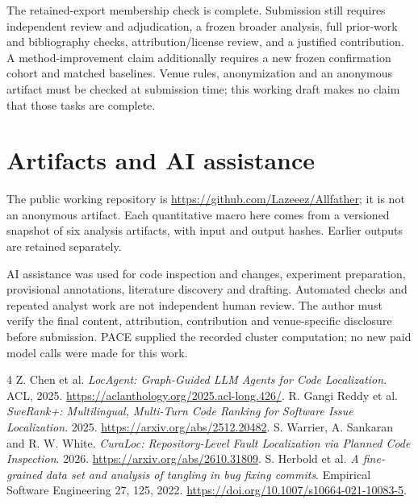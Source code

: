 \documentclass[11pt]{article}
\begin{document}
The retained-export membership check is complete. Submission still requires independent review and adjudication, a
frozen broader analysis, full prior-work and bibliography checks, attribution/license
review, and a justified contribution. A method-improvement claim additionally requires a
new frozen confirmation cohort and matched baselines. Venue rules, anonymization and an
anonymous artifact must be checked at submission time; this working draft makes no claim
that those tasks are complete.

\section*{Artifacts and AI assistance}
The public working repository is \url{https://github.com/Lazeeez/Allfather}; it is not an
anonymous artifact. Each quantitative macro here comes from a versioned snapshot of six
analysis artifacts, with input and output hashes. Earlier outputs are retained separately.

AI assistance was used for code inspection and changes, experiment preparation, provisional
annotations, literature discovery and drafting. Automated checks and repeated analyst work
are not independent human review. The author must verify the final content, attribution,
contribution and venue-specific disclosure before submission. PACE supplied the recorded
cluster computation; no new paid model calls were made for this work.

\begin{thebibliography}{4}
 Z. Chen et al. \emph{LocAgent: Graph-Guided LLM Agents for Code Localization}.
ACL, 2025. \url{https://aclanthology.org/2025.acl-long.426/}.
 R. Gangi Reddy et al. \emph{SweRank+: Multilingual, Multi-Turn Code Ranking
for Software Issue Localization}. 2025. \url{https://arxiv.org/abs/2512.20482}.
 S. Warrier, A. Sankaran and R. W. White. \emph{CuraLoc: Repository-Level Fault
Localization via Planned Code Inspection}. 2026. \url{https://arxiv.org/abs/2610.31809}.
 S. Herbold et al. \emph{A fine-grained data set and analysis of tangling in bug
fixing commits}. Empirical Software Engineering 27, 125, 2022.
\url{https://doi.org/10.1007/s10664-021-10083-5}.
\end{thebibliography}
\end{document}
